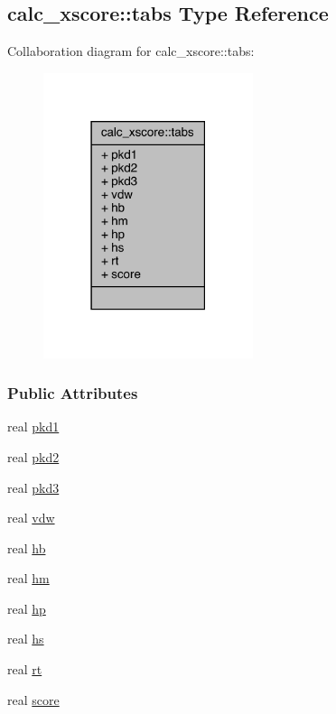 \hypertarget{structcalc__xscore_1_1tabs}{\subsection{calc\-\_\-xscore\-:\-:tabs Type Reference}
\label{structcalc__xscore_1_1tabs}
}


Collaboration diagram for calc\-\_\-xscore\-:\-:tabs\-:
\nopagebreak
\begin{figure}[H]
\begin{center}
\leavevmode
\includegraphics[width=174pt]{structcalc__xscore_1_1tabs__coll__graph}
\end{center}
\end{figure}
\subsubsection*{Public Attributes}
\begin{DoxyCompactItemize}
\item 
real \hyperlink{structcalc__xscore_1_1tabs_af974dc5008391f1c728a37faa01ff16a}{pkd1}
\item 
real \hyperlink{structcalc__xscore_1_1tabs_a7ea61af1d13d5f701a81b81256bc460d}{pkd2}
\item 
real \hyperlink{structcalc__xscore_1_1tabs_a59d2e28084a9183a06b692db0f23cf4f}{pkd3}
\item 
real \hyperlink{structcalc__xscore_1_1tabs_a4780e50e91b0190aded463e7cd212125}{vdw}
\item 
real \hyperlink{structcalc__xscore_1_1tabs_aec756f565720260b3581f274b7f677f4}{hb}
\item 
real \hyperlink{structcalc__xscore_1_1tabs_a7e93d107af5a735c6718bd954f23c534}{hm}
\item 
real \hyperlink{structcalc__xscore_1_1tabs_a81835040b328cd9cb62f8985135ee89f}{hp}
\item 
real \hyperlink{structcalc__xscore_1_1tabs_a757e19540cb2c6312ac4853cbf76b7de}{hs}
\item 
real \hyperlink{structcalc__xscore_1_1tabs_aa3ea7bf40c30a9cfbc0f785297a320b5}{rt}
\item 
real \hyperlink{structcalc__xscore_1_1tabs_afcc90593c75b10127baf40177c3f478e}{score}
\end{DoxyCompactItemize}



